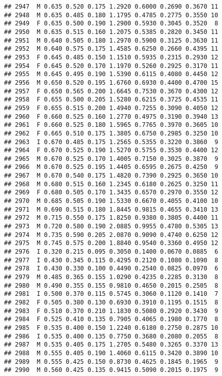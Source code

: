 \documentclass[
]{article}
\begin{document}
\begin{verbatim}
## 2947  M 0.635 0.520 0.175 1.2920 0.6000 0.2690 0.3670 11
## 2948  M 0.635 0.485 0.180 1.1795 0.4785 0.2775 0.3550 10
## 2949  F 0.635 0.500 0.190 1.2900 0.5930 0.3045 0.3520  8
## 2950  M 0.635 0.515 0.160 1.2075 0.5385 0.2820 0.3450 11
## 2951  M 0.640 0.505 0.180 1.2970 0.5900 0.3125 0.3630 11
## 2952  M 0.640 0.575 0.175 1.4585 0.6250 0.2660 0.4395 11
## 2953  F 0.645 0.485 0.150 1.1510 0.5935 0.2315 0.2930 12
## 2954  F 0.645 0.520 0.170 1.1970 0.5260 0.2925 0.3170 11
## 2955  M 0.645 0.495 0.190 1.5390 0.6115 0.4080 0.4450 12
## 2956  M 0.650 0.520 0.195 1.6760 0.6930 0.4400 0.4700 15
## 2957  F 0.650 0.565 0.200 1.6645 0.7530 0.3670 0.4300 12
## 2958  F 0.655 0.500 0.205 1.5280 0.6215 0.3725 0.4535 11
## 2959  F 0.655 0.515 0.200 1.4940 0.7255 0.3090 0.4050 12
## 2960  F 0.660 0.525 0.160 1.2770 0.4975 0.3190 0.3940 13
## 2961  F 0.660 0.525 0.180 1.5965 0.7765 0.3970 0.3605 10
## 2962  F 0.665 0.510 0.175 1.3805 0.6750 0.2985 0.3250 10
## 2963  I 0.670 0.485 0.175 1.2565 0.5355 0.3220 0.3860  9
## 2964  F 0.670 0.525 0.190 1.5270 0.5755 0.3530 0.4400 12
## 2965  M 0.670 0.525 0.170 1.4005 0.7150 0.3025 0.3870  9
## 2966  M 0.670 0.525 0.195 1.4405 0.6595 0.2675 0.4250  9
## 2967  M 0.670 0.540 0.175 1.4820 0.7390 0.2925 0.3650 10
## 2968  M 0.680 0.515 0.160 1.2345 0.6180 0.2625 0.3250 11
## 2969  F 0.680 0.505 0.170 1.3435 0.6570 0.2970 0.3550 12
## 2970  M 0.685 0.505 0.190 1.5330 0.6670 0.4055 0.4100 10
## 2971  M 0.690 0.515 0.180 1.8445 0.9815 0.4655 0.3410 13
## 2972  M 0.715 0.550 0.175 1.8250 0.9380 0.3805 0.4400 11
## 2973  M 0.720 0.580 0.190 2.0885 0.9955 0.4780 0.5305 13
## 2974  M 0.735 0.590 0.205 2.0870 0.9090 0.4740 0.6250 12
## 2975  M 0.745 0.575 0.200 1.8840 0.9540 0.3360 0.4950 12
## 2976  I 0.320 0.215 0.095 0.3050 0.1400 0.0670 0.0885  6
## 2977  I 0.430 0.345 0.115 0.4295 0.2120 0.1080 0.1090  8
## 2978  I 0.430 0.330 0.100 0.4490 0.2540 0.0825 0.0970  6
## 2979  M 0.485 0.365 0.155 1.0290 0.4235 0.2285 0.3130  8
## 2980  M 0.490 0.355 0.155 0.9810 0.4650 0.2015 0.2505  8
## 2981  I 0.500 0.370 0.115 0.5745 0.3060 0.1120 0.1410  7
## 2982  F 0.505 0.380 0.130 0.6930 0.3910 0.1195 0.1515  8
## 2983  F 0.510 0.370 0.210 1.1830 0.5080 0.2920 0.3430  9
## 2984  F 0.525 0.410 0.135 0.7905 0.4065 0.1980 0.1770  8
## 2985  F 0.535 0.400 0.150 1.2240 0.6180 0.2750 0.2875 10
## 2986  I 0.535 0.400 0.135 0.7750 0.3680 0.2080 0.2055  8
## 2987  M 0.535 0.405 0.175 1.2705 0.5480 0.3265 0.3370 13
## 2988  M 0.555 0.405 0.190 1.4060 0.6115 0.3420 0.3890 10
## 2989  M 0.555 0.425 0.150 0.8730 0.4625 0.1845 0.1965  9
## 2990  M 0.560 0.425 0.135 0.9415 0.5090 0.2015 0.1975  9

\end{verbatim}
\end{document}
